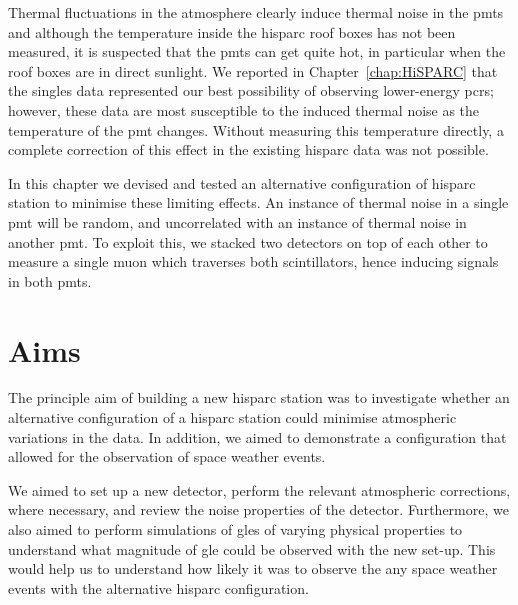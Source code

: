 Thermal fluctuations in the atmosphere clearly induce thermal noise in the \glspl{pmt} and although the temperature inside the \gls{hisparc} roof boxes has not been measured, it is suspected that the \glspl{pmt} can get quite hot, in particular when the roof boxes are in direct sunlight. We reported in Chapter~\ref{chap:HiSPARC} that the singles data represented our best possibility of observing lower-energy \glspl{pcr}; however, these data are most susceptible to the induced thermal noise as the temperature of the \gls{pmt} changes. Without measuring this temperature directly, a complete correction of this effect in the existing \gls{hisparc} data was not possible.

In this chapter we devised and tested an alternative configuration of \gls{hisparc} station to minimise these limiting effects. An instance of thermal noise in a single \gls{pmt} will be random, and uncorrelated with an instance of thermal noise in another \gls{pmt}. To exploit this, we stacked two detectors on top of each other to measure a single muon which traverses both scintillators, hence inducing signals in both \glspl{pmt}.




\section{Aims}\label{sec:HS_14008_aims}

The principle aim of building a new \gls{hisparc} station was to investigate whether an alternative configuration of a \gls{hisparc} station could minimise atmospheric variations in the data. In addition, we aimed to demonstrate a configuration that allowed for the observation of space weather events.

We aimed to set up a new detector, perform the relevant atmospheric corrections, where necessary, and review the noise properties of the detector. Furthermore, we also aimed to perform simulations of \glspl{gle} of varying physical properties to understand what magnitude of \gls{gle} could be observed with the new set-up. This would help us to understand how likely it was to observe the any space weather events with the alternative \gls{hisparc} configuration.



